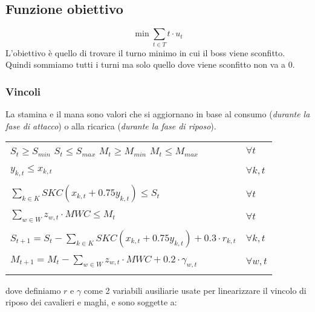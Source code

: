 \documentclass[12pt]{article}
\begin{document}
   \subsection{Funzione obiettivo}
    \begin{equation}
        \min \sum_{t \in T} t \cdot u_t
    \end{equation}
    L'obiettivo è quello di trovare il turno minimo in cui il boss viene sconfitto. Quindi sommiamo tutti i turni ma solo quello dove viene sconfitto non va a 0.\\

    \subsubsection{Vincoli}
La stamina e il mana sono valori che si aggiornano in base al consumo (\textit{durante la fase di attacco}) o alla ricarica (\textit{durante la fase di riposo}).\\
    \begin{tabular*}{\textwidth}{@{\extracolsep{\fill}} ll}
        \\
        $S_{t} \geq S_{min}$ \hspace{1cm} $S_{t} \leq S_{max}$ \hspace{1cm} $M_{t} \geq M_{min}$ \hspace{1cm} $M_{t} \leq M_{max}$  & $\forall t$ \\
        \\
        $y_{k,t} \leq x_{k,t}$ & $\forall k,t$ \\
        & \\
        $\sum_{k \in K} SKC(x_{k,t} + 0.75 y_{k,t}) \leq S_t$ & $\forall t$ \\
        & \\
        $\sum_{w \in W} z_{w,t} \cdot MWC \leq M_t$ & $\forall t$ \\
        & \\
       $S_{t+1} = S_t - \sum_{k \in K} SKC (x_{k,t} +0.75 y_{k,t}) + 0.3 \cdot r_{k,t}$ & $\forall k,t$ \\
       & \\
       $M_{t+1} = M_t - \sum_{w \in W} z_{w,t} \cdot MWC + 0.2 \cdot \gamma_{w,t}$ & $\forall w,t$ \\
         & \\
    \end{tabular*}
    dove definiamo $r$ e $\gamma$ come 2 variabili ausiliarie usate per linearizzare il vincolo di riposo dei cavalieri e maghi, e sono soggette a:\\
\end{document}
